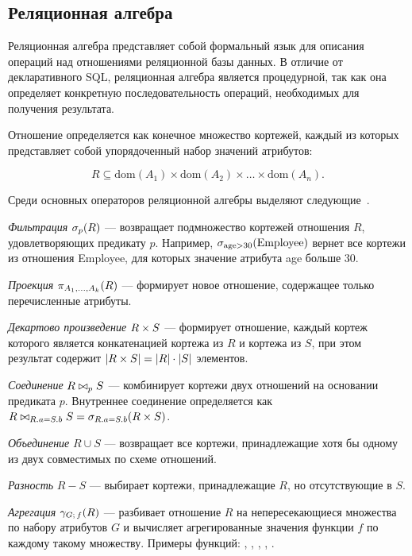 \documentclass[14pt, russian]{scrartcl}
\begin{document}
\subsection{Реляционная алгебра}

Реляционная алгебра представляет собой формальный язык для описания операций над
отношениями реляционной базы данных. В отличие от декларативного SQL,
реляционная алгебра является процедурной, так как она определяет конкретную
последовательность операций, необходимых для получения результата.

Отношение определяется как конечное множество кортежей, каждый из которых
представляет собой упорядоченный набор значений атрибутов:

\[
  R \subseteq \text{dom}(A_1) \times \text{dom}(A_2) \times \ldots \times \text{dom}(A_n).
\]

Среди основных операторов реляционной алгебры выделяют
следующие~\cite{silberschatz2020database}.

\emph{Фильтрация} \(\sigma_{p}(R)\) --- возвращает подмножество кортежей отношения
\(R\), удовлетворяющих предикату \(p\). Например,
\(\sigma_{\text{age} > 30}(\text{Employee})\) вернет все кортежи из отношения
Employee, для которых значение атрибута age больше 30.

\emph{Проекция} \(\pi_{A_1, \ldots, A_k}(R)\) --- формирует новое
отношение, содержащее только перечисленные атрибуты.

\emph{Декартово произведение} \(R \times S\) --- формирует отношение, каждый
кортеж которого является конкатенацией кортежа из \(R\) и кортежа из \(S\), при
этом результат содержит \(|R \times S| = |R| \cdot |S|\) элементов.

\emph{Соединение} \(R \bowtie_{p} S\) --- комбинирует кортежи двух отношений
на основании предиката \(p\). Внутреннее соединение определяется как
\(R \bowtie_{R.a = S.b} S = \sigma_{R.a = S.b}(R \times S)\).

\emph{Объединение} \(R \cup S\) --- возвращает все кортежи, принадлежащие хотя
бы одному из двух совместимых по схеме отношений.

\emph{Разность} \(R - S\) --- выбирает кортежи, принадлежащие \(R\), но
отсутствующие в \(S\).

\emph{Агрегация} \(\gamma_{G;\,f}(R)\) --- разбивает отношение \(R\) на
непересекающиеся множества по набору атрибутов \(G\) и вычисляет агрегированные
значения функции \(f\) по каждому такому множеству. Примеры функций: \COUNT,
\SUM, \AVG, \MIN, \MAX.
\end{document}
